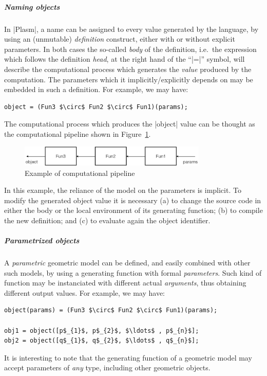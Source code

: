 \subparagraph{Naming objects}

In |Plasm|, a name can be assigned to every value generated by the
language, by using an (unmutable) \emph{definition} construct, either with or without
explicit parameters.  In both cases the so-called \textit{body} of the
definition, i.e.~the expression which follows the definition
\emph{head}, at the right hand of the ``|=|” symbol, will
describe the computational process which generates the  \emph{value}
produced by the computation.  The parameters which it
implicitly/explicitly depends on may be embedded in such a definition.
For example, we may have:
\begin{lstlisting}[language=JuliaLocal, style=julia, mathescape = true]
object = (Fun3 $\circ$ Fun2 $\circ$ Fun1)(params);
\end{lstlisting}
The computational process which produces the |object| value can be 
thought as the computational pipeline shown in 
Figure~\ref{fig:1:5:pipeline}.
\begin{figure}[htbp] %
   \centering
   \includegraphics[width=0.8\textwidth]{chapter-01/figs/pipeline.pdf} 
	\caption{Example of computational pipeline}
   \label{fig:1:5:pipeline}
\end{figure}

In this example, the reliance of the model on the 
parameters is implicit.  To modify the generated object value 
it is necessary (a) to change the source code in either the body or 
the local environment of its generating function; (b) to compile the 
new definition; and (c) to evaluate again the object identifier.

\subparagraph{Parametrized objects}

A \textit{parametric} geometric model can be defined, and easily
combined with other such models, by using a generating function with
{formal} \emph{parameters}.  Such kind of function may be instanciated
with different {actual} \emph{arguments}, thus obtaining different
output values.  For example, we may have:
\begin{lstlisting}[language=JuliaLocal, style=julia, mathescape = true]
object(params) = (Fun3 $\circ$ Fun2 $\circ$ Fun1)(params);

obj1 = object([p$_{1}$, p$_{2}$, $\ldots$ , p$_{n}$];
obj2 = object([q$_{1}$, q$_{2}$, $\ldots$ , q$_{n}$];
\end{lstlisting}
It is interesting to note that the generating function of a geometric
model may accept parameters of \emph{any} type, including other
geometric objects.




